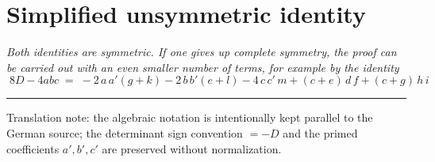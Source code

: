 \documentclass[11pt]{article}
\begin{document}
\section*{Simplified unsymmetric identity}

\emph{Both identities are symmetric. If one gives up complete symmetry, the proof
can be carried out with an even smaller number of terms, for example by the
identity}
\[
\boxed{\;8D-4abc \;=\; -2\,a\,a'(g+k)-2\,b\,b'(e+l)-4\,c\,c'\,m+(c+e)\,d\,f+(c+g)\,h\,i\;}
\]

\bigskip
\hrule\medskip
\noindent\footnotesize Translation note: the algebraic notation is intentionally kept
parallel to the German source; the determinant sign convention $=-D$ and the primed
coefficients $a',b',c'$ are preserved without normalization.
\end{document}
